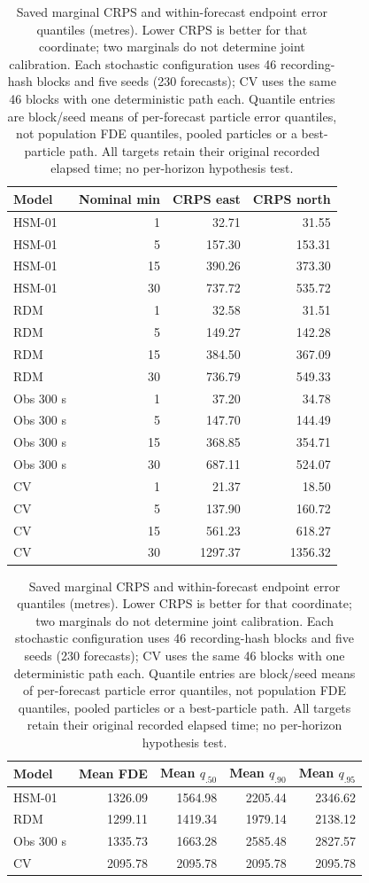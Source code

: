 \begin{table}[htbp]
\centering\small
\caption{Saved marginal CRPS and within-forecast endpoint error quantiles (metres). Lower CRPS is better for that coordinate; two marginals do not determine joint calibration. Each stochastic configuration uses 46 recording-hash blocks and five seeds (230 forecasts); CV uses the same 46 blocks with one deterministic path each. Quantile entries are block/seed means of per-forecast particle error quantiles, not population FDE quantiles, pooled particles or a best-particle path. All targets retain their original recorded elapsed time; no per-horizon hypothesis test.}
\label{tab:crps-endpoint-diagnostics}
\begin{tabular}{@{}lrrr@{}}
\toprule
Model & Nominal min & CRPS east & CRPS north\\
\midrule
HSM-01 & 1 & 32.71 & 31.55\\
HSM-01 & 5 & 157.30 & 153.31\\
HSM-01 & 15 & 390.26 & 373.30\\
HSM-01 & 30 & 737.72 & 535.72\\
RDM & 1 & 32.58 & 31.51\\
RDM & 5 & 149.27 & 142.28\\
RDM & 15 & 384.50 & 367.09\\
RDM & 30 & 736.79 & 549.33\\
Obs 300 s & 1 & 37.20 & 34.78\\
Obs 300 s & 5 & 147.70 & 144.49\\
Obs 300 s & 15 & 368.85 & 354.71\\
Obs 300 s & 30 & 687.11 & 524.07\\
CV & 1 & 21.37 & 18.50\\
CV & 5 & 137.90 & 160.72\\
CV & 15 & 561.23 & 618.27\\
CV & 30 & 1297.37 & 1356.32\\
\bottomrule
\end{tabular}
\par\medskip
\begin{tabular}{@{}lrrrr@{}}
\toprule
Model & Mean FDE & Mean $q_{.50}$ & Mean $q_{.90}$ & Mean $q_{.95}$\\
\midrule
HSM-01 & 1326.09 & 1564.98 & 2205.44 & 2346.62\\
RDM & 1299.11 & 1419.34 & 1979.14 & 2138.12\\
Obs 300 s & 1335.73 & 1663.28 & 2585.48 & 2827.57\\
CV & 2095.78 & 2095.78 & 2095.78 & 2095.78\\
\bottomrule
\end{tabular}
\end{table}
